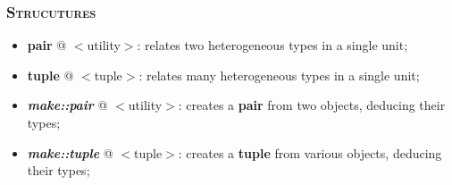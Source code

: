 \documentclass[10pt]{article}
\begin{document}
\begin{multicols*}{5}
{{\subsubsection*{\textsc{Strucutures}} 
\begin{itemize}[leftmargin=*,topsep=0.25pt]
  \setlength\itemsep{-1.8pt}
\item  {\textbf{pair}} @ $<$utility$>$: relates two heterogeneous types in a single unit; 
\item  {\textbf{tuple}} @ $<$tuple$>$: relates many heterogeneous types in a single unit; 
\item  \emph{\textbf{make::pair}} @ $<$utility$>$: creates a \textbf{pair} from two objects, deducing their types; 
\item  \emph{\textbf{make::tuple}} @ $<$tuple$>$: creates a \textbf{tuple} from various objects, deducing their types; 
\end{itemize}


}

}


\end{multicols*}
\end{document}
